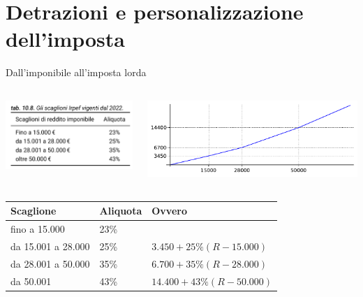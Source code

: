 \documentclass[aspectratio=64,12pt]{beamer}
\newcommand\€{\,\text{€}}
\begin{document}
\section{Detrazioni e personalizzazione dell'imposta}


\begin{frame}{Dall'imponibile all'imposta lorda}

  \begin{columns}
    \begin{column}{.35\textwidth}
\centering
\includegraphics[height=2.7cm]{./figure/scaglioni-IRPEF-2022.png}
\end{column}
\begin{column}{.65\textwidth}
\centering
\includegraphics[height=3cm]{./figure/scaglioni-2022-grafico.pdf}
\end{column}
\end{columns}

\small
\begin{tabular}{lll}
Scaglione & Aliquota & Ovvero\\[0pt]
\hline
fino a 15.000 & 23\% & \\[0pt]
da 15.001 a 28.000 & 25\% & $3.450 + 25\% (R - 15.000)$\\[0pt]
da 28.001 a 50.000 & 35\% & $6.700 + 35\% (R - 28.000)$\\[0pt]
da 50.001 & 43\% & $14.400 + 43\% (R - 50.000)$\\[0pt]
\end{tabular}
\end{frame}
\end{document}
